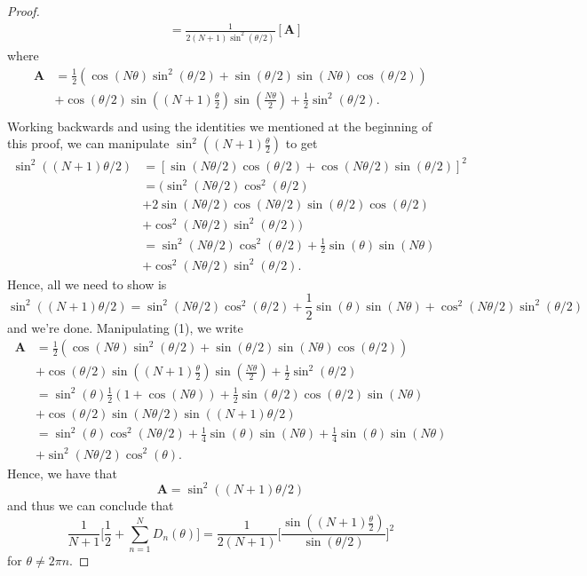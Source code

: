 \begin{proof}
\begin{align*}
    &= \frac{ 1 }{ 2 (N+1) \sin^{2}(\theta/2)  } [ \mathbf{A} ]
\end{align*}
where 
\begin{align*}
    \mathbf{A} &= \frac{ 1 }{ 2 } ( \cos(N\theta) \sin^{2}(\theta/2) + \sin(\theta/2) \sin(N \theta) \cos(\theta/2)) \\ &+ \cos(\theta/2) \sin((N+1) \frac{ \theta }{ 2 }  ) \sin(\frac{ N \theta }{ 2 } )  + \frac{ 1 }{ 2 }  \sin^{2}(\theta/2). \tag{1} \\
\end{align*}
Working backwards and using the identities we mentioned at the beginning of this proof, we can manipulate \( \sin^{2}((N+1) \frac{ \theta }{ 2 } ) \) to get 
\begin{align*}
    \sin^{2}((N+1) \theta/2 ) &= [ \sin(N\theta/2) \cos(\theta/2) + \cos(N \theta/2) \sin(\theta/2)]^{2}   \\
                              &= (\sin^{2}(N \theta/2) \cos^{2}(\theta/2) \\ &+ 2\sin(N\theta/2) \cos(N\theta/2) \sin(\theta/2) \cos(\theta/2) \\ &+ \cos^{2}(N\theta/2) \sin^{2}(\theta/2) )  \\   
                              &= \sin^{2}(N\theta/2) \cos^{2}(\theta/2) + \frac{ 1 }{ 2 } \sin(\theta) \sin(N\theta) \\ 
                              &+ \cos^{2}(N \theta/2) \sin ^{2}(\theta/2).  
\end{align*}
Hence, all we need to show is 
\[  \sin ^{2}((N+1)\theta/2) =  \sin^{2}(N\theta/2) \cos^{2}(\theta/2) + \frac{ 1 }{ 2 } \sin(\theta) \sin(N\theta) + \cos^{2}(N\theta/2) \sin^{2}(\theta/2)  \]
and we're done. Manipulating (1), we write
\begin{align*}
    \mathbf{A} &= \frac{ 1 }{ 2 } ( \cos(N\theta) \sin^{2}(\theta/2) + \sin(\theta/2) \sin(N \theta) \cos(\theta/2)) \\ &+ \cos(\theta/2) \sin((N+1) \frac{ \theta }{ 2 }  ) \sin(\frac{ N \theta }{ 2 } )  + \frac{ 1 }{ 2 }  \sin^{2}(\theta/2)  \\
               &=  \sin^{2}(\theta) \frac{ 1 }{ 2 } (1 + \cos(N\theta)) + \frac{ 1 }{ 2 } \sin(\theta/2) \cos(\theta/2) \sin(N\theta) \\ &+ \cos(\theta/2) \sin(N\theta/2) \sin((N+1) \theta/2) \\ 
               &= \sin^{2}(\theta) \cos^{2}(N \theta/2) + \frac{ 1 }{ 4 } \sin(\theta) \sin(N\theta) + \frac{ 1 }{ 4 } \sin(\theta) \sin(N\theta) \\ 
               &+ \sin^{2}(N \theta/2) \cos^{2}(\theta).
\end{align*}
Hence, we have that 
\[  \mathbf{A} = \sin^{2}((N+1)\theta/2)  \]
and thus we can conclude that
\[  \frac{ 1 }{ N+1 } \Big[ \frac{ 1 }{ 2 }  + \sum_{ n=1 }^{ N } D_{n}(\theta) \Big] = \frac{ 1 }{ 2(N+1)  } \Big[ \frac{ \sin((N+1) \frac{ \theta }{ 2 } ) }{ \sin(\theta/2) } \Big]^{2} \]
for \( \theta \neq 2 \pi n \).
\end{proof}

